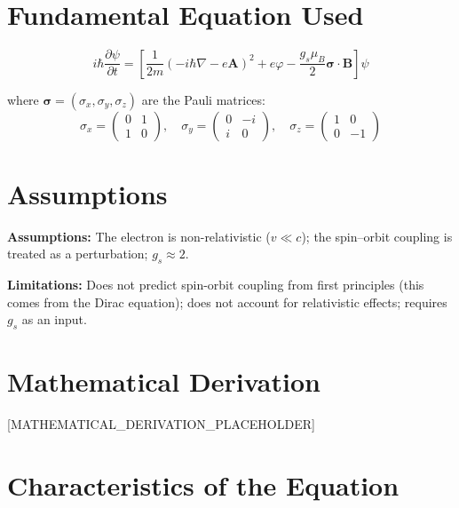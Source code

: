 \documentclass[11pt,openright]{book}
\begin{document}
\section*{Fundamental Equation Used}

\begin{equation}
\boxed{\; i\hbar\frac{\partial\psi}{\partial t} = \left[\frac{1}{2m}\left(-i\hbar\nabla - e\mathbf{A}\right)^{2} + e\varphi - \frac{g_{s}\mu_{B}}{2}\boldsymbol{\sigma}\cdot\mathbf{B}\right]\psi\;}
\label{eq:pauli}
\end{equation}

where $\boldsymbol{\sigma} = (\sigma_{x}, \sigma_{y}, \sigma_{z})$ are the Pauli matrices:
\begin{equation}
\sigma_{x} = \begin{pmatrix}0&1\\1&0\end{pmatrix}, \quad
\sigma_{y} = \begin{pmatrix}0&-i\\i&0\end{pmatrix}, \quad
\sigma_{z} = \begin{pmatrix}1&0\\0&-1\end{pmatrix}
\label{eq:pauli-matrices}
\end{equation}
\section*{Assumptions}

\textbf{Assumptions:} The electron is non-relativistic ($v \ll c$); the spin--orbit coupling is treated as a perturbation; $g_{s} \approx 2$.


\textbf{Limitations:} Does not predict spin-orbit coupling from first principles (this comes from the Dirac equation); does not account for relativistic effects; requires $g_{s}$ as an input.


\section*{Mathematical Derivation}

[MATHEMATICAL_DERIVATION_PLACEHOLDER]

\section*{Characteristics of the Equation}
\end{document}
